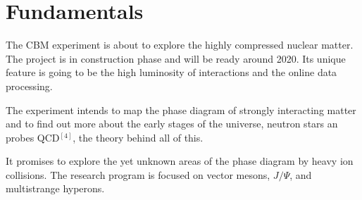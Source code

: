 \documentclass[a4paper,12pt]{article}
\begin{document}
\section{Fundamentals}
\par The CBM experiment is about to explore the highly compressed nuclear matter. The project is in construction phase and will be ready around 2020. Its unique feature is going to be the high luminosity of interactions and the online data processing.
\vspace{5mm}
\par The experiment intends to map the phase diagram of strongly interacting matter and to find out more about the early stages of the universe, neutron stars an probes QCD$^{[4]}$, the theory behind all of this.
\vspace{5mm}
\par It promises to explore the yet unknown areas of the phase diagram by heavy ion collisions. The research program is focused on vector mesons, $J/\Psi$, and multistrange hyperons.
\end{document}
